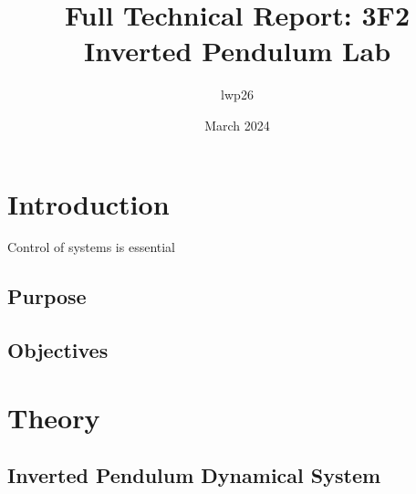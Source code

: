 \documentclass{article}
\begin{document}
\title{Full Technical Report: 3F2 Inverted Pendulum Lab}
\author{lwp26}
\date{March 2024}
\maketitle 

\begin{abstract}
    \centering

\end{abstract}

\newpage

\section{Introduction}
Control of systems is essential  

\subsection{Purpose}

\subsection{Objectives}


\section{Theory}

\subsection{Inverted Pendulum Dynamical System}
\end{document}
